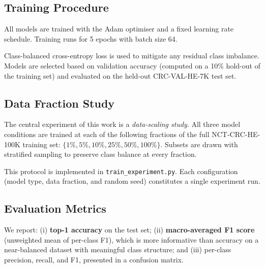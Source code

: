 \subsection{Training Procedure}

All models are trained with the Adam optimiser and a fixed learning rate schedule.
Training runs for 5 epochs with batch size 64.

Class-balanced cross-entropy loss is used to mitigate any residual class imbalance.
Models are selected based on validation accuracy (computed on a 10\% hold-out of the
training set) and evaluated on the held-out CRC-VAL-HE-7K test set.

\subsection{Data Fraction Study}
\label{subsec:data-fraction}

The central experiment of this work is a \emph{data-scaling study}. All three model
conditions are trained at each of the following fractions of the full NCT-CRC-HE-100K
training set: \(\{1\%, 5\%, 10\%, 25\%, 50\%, 100\%\}\). Subsets are drawn with
stratified sampling to preserve class balance at every fraction.

This protocol is implemented in \texttt{train\_experiment.py}. Each configuration (model
type, data fraction, and random seed) constitutes a single experiment run.

\subsection{Evaluation Metrics}

We report: (i) \textbf{top-1 accuracy} on the test set; (ii) \textbf{macro-averaged F1
score} (unweighted mean of per-class F1), which is more informative than accuracy on a
near-balanced dataset with meaningful class structure; and (iii) per-class precision,
recall, and F1, presented in a confusion matrix.
